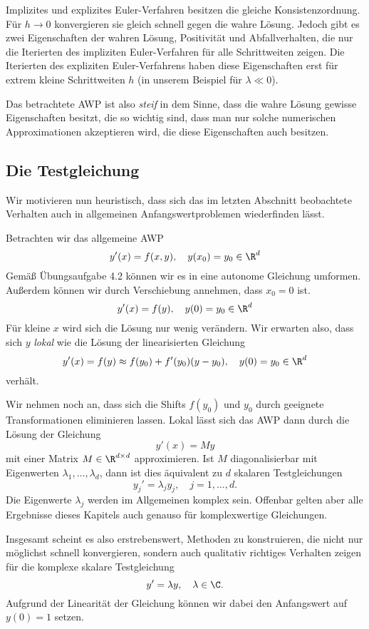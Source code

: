 \documentclass[
]{mycourse}
\theoremstyle{mythm}
\theoremstyle{break}
\begin{document}
Implizites und explizites Euler-Verfahren besitzen die gleiche Konsistenzordnung. Für $h\to 0$ konvergieren sie gleich schnell gegen die wahre Lösung. Jedoch gibt es zwei Eigenschaften der wahren Lösung, Positivität und Abfallverhalten, 
die nur die Iterierten des impliziten Euler-Verfahren für alle Schrittweiten zeigen. Die Iterierten des expliziten Euler-Verfahrens haben diese Eigenschaften erst für extrem kleine Schrittweiten $h$ (in unserem Beispiel für $\lambda \ll 0$).

Das betrachtete AWP ist also \emph{steif} in dem Sinne, dass die wahre Lösung gewisse Eigenschaften besitzt, die 
so wichtig sind, dass man nur solche numerischen Approximationen akzeptieren wird, die diese Eigenschaften auch besitzen.

\subsection{Die Testgleichung}

Wir motivieren nun heuristisch, dass sich das im letzten Abschnitt beobachtete Verhalten
auch in allgemeinen Anfangswertproblemen wiederfinden lässt.


Betrachten wir das allgemeine AWP
\[
y'(x)=f(x,y), \quad y(x_0)=y_0\in \R^d
\]
Gemäß Übungsaufgabe 4.2 können wir es in eine autonome Gleichung umformen. Außerdem können wir durch Verschiebung annehmen, 
dass $x_0=0$ ist.
\[
y'(x)=f(y),  \quad y(0)=y_0\in \R^d
\]
Für kleine $x$ wird sich die Lösung nur wenig verändern. Wir erwarten also, dass sich 
$y$ \emph{lokal} wie die Lösung der linearisierten Gleichung
\[
y'(x)=f(y)\approx f(y_0)+f'(y_0)(y-y_0), \quad y(0)=y_0\in \R^d
\]
verhält. 

Wir nehmen noch an, dass sich die Shifts $f(y_0)$ und $y_0$ durch geeignete Transformationen eliminieren lassen. 
Lokal lässt sich das AWP dann durch die Lösung der Gleichung 
\[
y'(x)=M y
\]
mit einer Matrix $M\in \R^{d\times d}$ approximieren. Ist $M$ diagonalisierbar mit Eigenwerten $\lambda_1,\ldots,\lambda_d$, dann ist dies äquivalent zu $d$ skalaren Testgleichungen
\[
y_j'=\lambda_j y_j, \quad j=1,\ldots,d.
\] 
Die Eigenwerte $\lambda_j$ werden im Allgemeinen komplex sein. Offenbar gelten aber alle Ergebnisse dieses Kapitels auch genauso für komplexwertige Gleichungen.

Insgesamt scheint es also erstrebenswert, Methoden zu konstruieren, die nicht nur möglichst schnell konvergieren, sondern auch
qualitativ richtiges Verhalten zeigen für die komplexe skalare Testgleichung
\[
y'=\lambda y, \quad \lambda\in \C.
\] 
Aufgrund der Linearität der Gleichung können wir dabei den Anfangswert auf $y(0)=1$ setzen.
\end{document}
